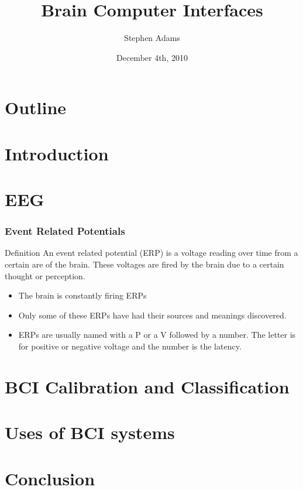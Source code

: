 \documentclass{beamer}
\title{Brain Computer Interfaces}
\author{Stephen Adams}
\date{December 4th, 2010}
\begin{document}
\begin{frame}
	\titlepage
\end{frame}

\section*{Outline}
	\begin{frame}
		\tableofcontents
	\end{frame}
	
	\section{Introduction}
	
	\section{EEG}
		\begin{frame}
			\frametitle{Event Related Potentials}
			 \begin{block}{Definition}
				 An event related potential (ERP) is a voltage reading over time from a certain are of the brain. These voltages are fired by the brain due to a certain thought or perception.
			 \end{block}			 
			 \begin{itemize}
			 \item The brain is constantly firing ERPs
			 \item Only some of these ERPs have had their sources and meanings discovered.
			 \item ERPs are usually named with a P or a V followed by a number. The letter is for positive or negative voltage and the number is the latency.
			 \end{itemize}
		\end{frame}
	\section{BCI Calibration and Classification}
	
	\section{Uses of BCI systems}
	
	\section{Conclusion}	
	
\end{document}
